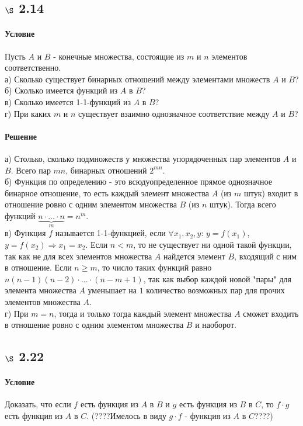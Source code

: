 \documentclass[a4paper,12pt]{article}
\begin{document}
\subsection*{$\S$ 2.14}
\paragraph*{Условие}
Пусть $A$ и $B$ - конечные множества, состоящие из $m$ и $n$ элементов соответственно.\\
а) Сколько существует бинарных отношений между элементами множеств $A$ и $B$?\\
б) Сколько имеется функций из $A$ в $B$?\\
в) Сколько имеется 1-1-функций из $A$ в $B$?\\
г) При каких $m$ и $n$ существует взаимно однозначное соответствие между $A$ и $B$?
\paragraph*{Решение}
а) Столько, сколько подмножеств у множества упорядоченных пар элементов $A$ и $B$. Всего пар $mn$,  бинарных отношений $2^{mn}$. \\
б) Функция по определению - это всюдуопределенное прямое однозначное бинарное отношение, то есть каждый элемент множества $A$ (из $m$ штук) входит в отношение ровно с одним элементом множества $B$ (из $n$ штук). Тогда всего функций $\underbrace{n\cdot \ldots \cdot n}_m = n^m$. \\
в) Функция $f$ называется 1-1-функцией, если $\forall x_1,x_2,y$: $y=f(x_1)$, $y=f(x_2)\Rightarrow x_1=x_2$. Если $n<m$, то не существует ни одной такой функции, так как не для всех элементов множества $A$ найдется элемент $B$, входящий с ним в отношение. Если $n\geqslant m$, то число таких функций равно $n(n-1)(n-2)\cdot \ldots \cdot (n-m+1)$, так как выбор каждой новой "пары" для элемента множества $A$ уменьшает на $1$ количество возможных пар для прочих элементов множества $A$.\\
г) При $m=n$, тогда и только тогда каждый элемент множества $A$ сможет входить в отношение ровно с одним элементом множества $B$ и наоборот.

\subsection*{$\S$ 2.22}
\paragraph*{Условие}
Доказать, что если $f$ есть функция из $A$ в $B$ и $g$ есть функция из $B$ в $C$, то $f\cdot g$ есть функция из $A$ в $C$. (????Имелось в виду $g\cdot f$ - функция из $A$ в $C$????)
\end{document}
